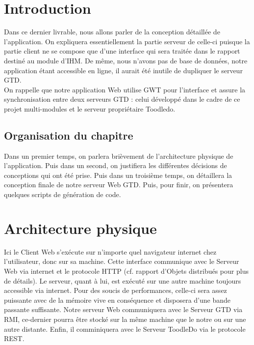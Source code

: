\chapter{Introduction}

    Dans ce dernier livrable, nous allons parler de la conception détaillée de l'application. On expliquera essentiellement la partie serveur de celle-ci puisque la partie client ne se compose que d'une interface qui sera traitée dans le rapport destiné au module d'IHM. De même, nous n'avons pas de base de données, notre application étant accessible en ligne, il aurait été inutile de dupliquer le serveur GTD.\\
    On rappelle que notre application Web utilise GWT pour l'interface et assure la synchronisation entre deux serveurs GTD : celui développé dans le cadre de ce projet multi-modules et le serveur propriétaire Toodledo.

\section{Organisation du chapitre}

    Dans un premier temps, on parlera brièvement de l'architecture physique de l'application. Puis dans un second, on justifiera les différentes décisions de conceptions qui ont été prise. Puis dans un troisième temps, on détaillera la conception finale de notre serveur Web GTD. Puis, pour finir, on présentera quelques scripts de génération de code.


\chapter{Architecture physique}




    Ici le Client Web s'exécute sur n'importe quel navigateur internet chez l'utilisateur, donc sur sa machine. Cette interface communique avec le Serveur Web via internet et le protocole HTTP (cf. rapport d'Objets distribués pour plus de détails). Le serveur, quant à lui, est exécuté sur une autre machine toujours accessible via internet. Pour des soucis de performances, celle-ci sera assez puissante avec de la mémoire vive en conséquence et disposera d'une bande passante suffisante. Notre serveur Web communiquera avec le Serveur GTD via RMI, ce-dernier pourra être stocké sur la même machine que le notre ou sur une autre distante. Enfin, il comminiquera avec le Serveur ToodleDo via le protocole REST.

